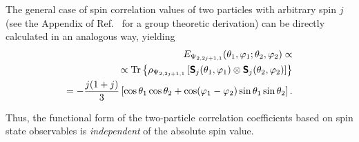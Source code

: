 The general case of spin correlation values of two particles with arbitrary spin $j$
(see the Appendix of Ref.~\cite{svozil-krenn} for a group theoretic derivation) can be directly
calculated in an analogous way, yielding
\begin{equation}
\begin{split}
E_{{ \Psi_{2,2j+1,1}}} (\theta_1,\varphi_1;\theta_2,\varphi_2 )
\propto
\\   \propto
{\rm Tr}\left\{ \rho_{ \Psi_{2,2j+1,1}}   \left[ \textsf{\textbf{S}}_{j}(\theta_1,\varphi_1) \otimes \textsf{\textbf{S}}_{j}(\theta_2,\varphi_2)\right]\right\} \\
= -\frac{j(1+j)}{3} \left[\cos \theta_1 \cos \theta_2 + \cos (\varphi_1 - \varphi_2) \sin \theta_1 \sin \theta_2\right]  .
\end{split}
\label{2009-gtq-edosgcjj}
\end{equation}

Thus, the functional form of the two-particle correlation coefficients based on spin state observables is {\em
independent} of the absolute spin value.
